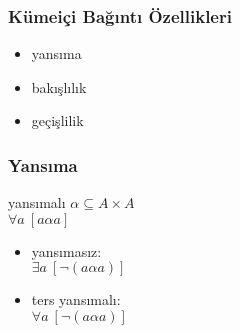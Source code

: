 \documentclass[dvipsnames]{beamer}
\theoremstyle{definition}
\theoremstyle{example}
\theoremstyle{plain}
\begin{document}
\begin{frame}
  \frametitle{Kümeiçi Bağıntı Özellikleri}

  \begin{itemize}
    \item yansıma
    \item bakışlılık
    \item geçişlilik
  \end{itemize}
\end{frame}

\begin{frame}
  \frametitle{Yansıma}

  \begin{block}{yansımalı}
    $\alpha \subseteq A \times A$\\
    $\forall a~[a \alpha a]$
  \end{block}

  \pause
  \begin{itemize}
    \item yansımasız:\\
      $\exists a~[\neg (a \alpha a)]$

    \pause
    \item ters yansımalı:\\
      $\forall a~[\neg (a \alpha a)]$
  \end{itemize}
\end{frame}
%
%
%
%
%
%
\end{document}
